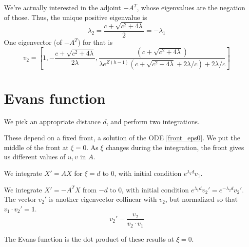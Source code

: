 \documentclass[10pt]{article}
\begin{document}
We're actually interested in the adjoint $-A^T$, whose eigenvalues are the negation of those.
Thus, the unique positive eigenvalue is
\[\lambda_2 = \frac{c + \sqrt{c^2 + 4 \lambda}}{2} = -\lambda_1 \]
One eigenvector (of $-A^T$) for that is
\[
v_2 = \left[1, -\frac{c + \sqrt{c^2 + 4 \lambda}}{2\lambda}, \frac{(c + \sqrt{c^2+4\lambda})}{\lambda e^{Z(h-1)}(c + \sqrt{c^2+4\lambda} + 2 \lambda/c)+ 2 \lambda / c}\right]
\]


\section{Evans function}
We pick an appropriate distance $d$, and perform two integrations.

These depend on a fixed front, a solution of the ODE \eqref{front_eps0}.
We put the middle of the front at $\xi = 0$.  As $\xi$ changes during the integration, the front gives us different values of $u,v$ in $A$.

We integrate $X' = AX$ for $\xi = d$ to $0$, with initial condition $e^{\lambda_1 d}v_1$.

We integrate $X' = -A^T X$ from $-d$ to $0$, with initial condition $e^{\lambda_1 d}v_2' = e^{-\lambda_2 d}v_2'$. The vector $v_2'$ is another eigenvector collinear with $v_2$, but normalized so that $v_1 \cdot v_2' = 1$.
\[v_2' = \frac{v_2}{v_2 \cdot v_1}\]

The Evans function is the dot product of these results at $\xi = 0$.
\end{document}
